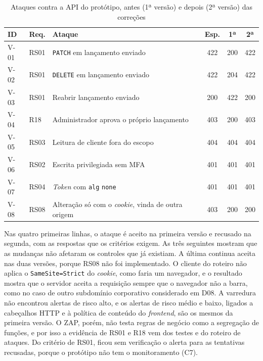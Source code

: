 \documentclass[conference]{IEEEtran}
\begin{document}
\begin{table}[!t]
\centering
\caption{Ataques contra a API do protótipo, antes (1ª versão) e depois (2ª versão) das correções}
\label{tab:verificacao}
\footnotesize
\renewcommand{\arraystretch}{1.15}
\begin{tabularx}{\columnwidth}{@{}l l Y c c c@{}}
\hline
\textbf{ID} & \textbf{Req.} & \textbf{Ataque} & \textbf{Esp.} & \textbf{1ª} & \textbf{2ª} \\
\hline
V-01 & RS01 & \texttt{PATCH} em lançamento enviado & 422 & 200 & 422 \\
V-02 & RS01 & \texttt{DELETE} em lançamento enviado & 422 & 204 & 422 \\
V-03 & RS01 & Reabrir lançamento enviado & 200 & 422 & 200 \\
V-04 & R18 & Administrador aprova o próprio lançamento & 403 & 200 & 403 \\
V-05 & RS03 & Leitura de cliente fora do escopo & 404 & 404 & 404 \\
V-06 & RS02 & Escrita privilegiada sem MFA & 401 & 401 & 401 \\
V-07 & RS04 & \textit{Token} com \texttt{alg} \texttt{none} & 401 & 401 & 401 \\
V-08 & RS08 & Alteração só com o \textit{cookie}, vinda de outra origem & 403 & 200 & 200 \\
\hline
\end{tabularx}
\end{table}

Nas quatro primeiras linhas, o ataque é aceito na primeira versão e recusado na segunda, com as respostas que os critérios exigem. As três seguintes mostram que as mudanças não afetaram os controles que já existiam. A última continua aceita nas duas versões, porque RS08 não foi implementado. O cliente do roteiro não aplica o \texttt{SameSite=Strict} do \textit{cookie}, como faria um navegador, e o resultado mostra que o servidor aceita a requisição sempre que o navegador não a barra, como no caso de outro subdomínio corporativo considerado em D08. A varredura não encontrou alertas de risco alto, e os alertas de risco médio e baixo, ligados a cabeçalhos HTTP e à política de conteúdo do \textit{frontend}, são os mesmos da primeira versão. O ZAP, porém, não testa regras de negócio como a segregação de funções, e por isso a evidência de RS01 e R18 vem dos testes e do roteiro de ataques. Do critério de RS01, ficou sem verificação o alerta para as tentativas recusadas, porque o protótipo não tem o monitoramento (C7).
\end{document}
